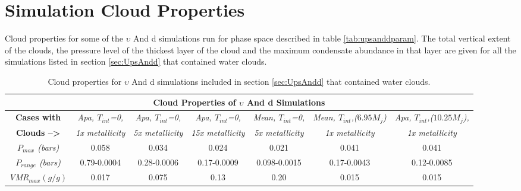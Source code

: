 \documentclass[12pt, letterpaper]{aastex631}
\begin{document}
\section{Simulation Cloud Properties} \label{sec:cloudprop}

Cloud properties for some of the $\upsilon$ And d simulations run for phase space described in table \ref{tab:upsanddparam}. The total vertical extent of the clouds, the pressure level of the thickest layer of the cloud and the maximum condensate abundance in that layer are given for all the simulations listed in section \ref{sec:UpsAndd} that contained water clouds. 


\begin{table}[h!]
\begin{tabular}{|c|c|c|c|c|c|c|}
\hline
\multicolumn{7}{|c|}{\textbf{Cloud Properties of $\upsilon$ And d Simulations}}                                                                                                                              \\ \hline 
\textbf{Cases with} & \textit{Apa, $T_{int}$=0,} & \textit{Apa, $T_{int}$=0,} & \textit{Apa, $T_{int}$=0,} & \textit{Mean, $T_{int}$=0,} & \textit{Mean, $T_{int}$,($6.95  M_{j}$)} & \textit{Apa, $T_{int}$,($10.25  M_{j}$),}  \\
\textbf{Clouds --\textgreater{}} & \textit{1x metallicity} & \textit{5x metallicity} & \textit{15x metallicity} & \textit{5x metallicity} & \textit{1x metallicity} & \textit{1x metallicity} 
\\ \hline
\textit{$P_{max}$ (bars)}                                                                & 0.058                                                            & 0.034                                                             & 0.024                                                            & 0.021  & 0.041 & 0.041                                                     \\ \hline
\textit{$P_{range}$ (bars)}                                                               & 0.79-0.0004                                                            & 0.28-0.0006                                                            & 0.17-0.0009                                                            & 0.098-0.0015     & 0.17-0.0043 & 0.12-0.0085                                                        \\ \hline
\textit{VMR$_{max} (g/g)$}                                                               & 0.017                                                            & 0.075                                                            & 0.13                                                            & 0.20                                                        & 0.015 & 0.015    \\ \hline
\end{tabular}
{\caption{Cloud properties for $\upsilon$ And d simulations included in  section \ref{sec:UpsAndd} that contained water clouds.} \label{tab:clouds}}
\end{table}
\end{document}
